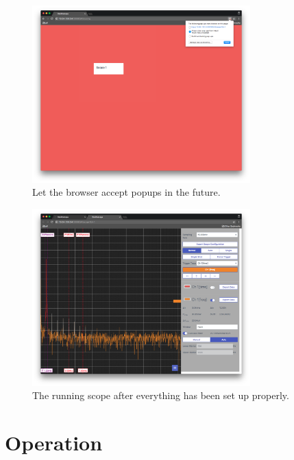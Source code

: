 \begin{figure}
    \centering
    \includegraphics[width=0.75\textwidth]{images/userguide/popup_yes}
    \caption[Accept popups in the future]{%
        Let the browser accept popups in the future.
    }
    \label{fig:userguide:popup:yes}
\end{figure}

\begin{figure}
    \centering
    \includegraphics[width=0.75\textwidth]{images/userguide/running}
    \caption[Running the scope]{%
        The running scope after everything has been set up properly.
    }
    \label{fig:userguide:running}
\end{figure}

%
%
\chapter{Operation} %
\label{ch:userguide:operation}

